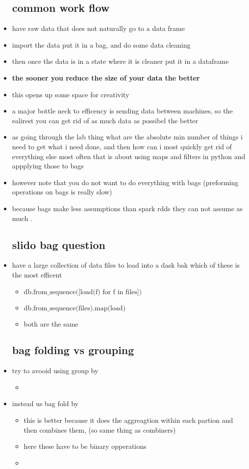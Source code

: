 \documentclass{article}
\begin{document}
\begin{itemize}
\subsection{common work flow}
\item have raw data that does not naturally go to a data frame 
\item import the data put it in a bag, and do some data cleaning 
\item then once the data is in a state where it is cleaner put it in a dataframe 
\item \textbf{the sooner you reduce the size of your data the better}
\item this opens up some space for creativity
\item a major bottle neck to efficency is sending data between machines, so the ealirest you can get rid of as much data as possibel the better
\item as going through the lab thing what are the absolute min number of things i need to get what i need done, and then how can i most quickly get rid of everything else most often that is about using maps and filters in python and appplying those to bags
\item however note that you do not want to do everything with bags (preforming operations on bags is really slow)
\item  because bags make less assumptions than spark rdds they can not assume as much . 
\subsection{slido bag question}
\item have a large collection of data files to load into a dask bak which of these is the most efficent 
\begin{itemize}
    \item $\text{db.from\_sequence([load(f) for f in files])}$
    \item $\text{db.from\_sequence(files).map(load)}$
    \item both are the same
\end{itemize}
\subsection{bag folding vs grouping}
\item try to avooid using group by 
\begin{itemize}
    \item 
\end{itemize}
\item instead us bag fold by 
\begin{itemize}
    \item this is better because it does the aggreagtion within each partion and then combines them, (so same thing as combiners)
    \item here these have to be binary opperations
    \item 
\end{itemize}

\end{itemize}
\end{document}
